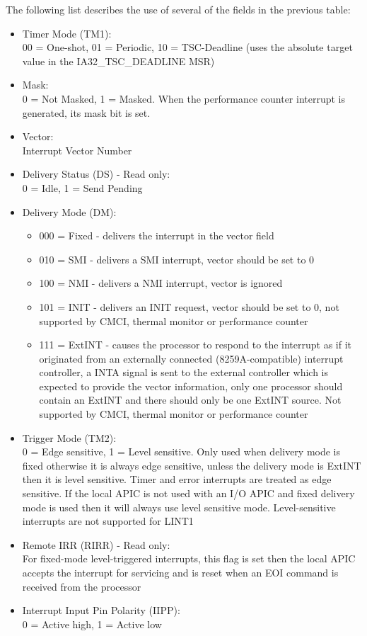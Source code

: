 \documentclass{article}
\newcommand{\layout}[1]{\parbox{\linewidth}{#1}}
\begin{document}
\layout{
  The following list describes the use of several of the fields in the previous table:
  \begin{itemize}
    \item Timer Mode (TM1): \\
      00 = One-shot, 01 = Periodic, 10 = TSC-Deadline (uses the absolute target value in the IA32\_TSC\_DEADLINE MSR)
    \item Mask: \\
      0 = Not Masked, 1 = Masked. When the performance counter interrupt is generated, its mask bit is set.
    \item Vector: \\
      Interrupt Vector Number
    \item Delivery Status (DS) - Read only: \\
      0 = Idle, 1 = Send Pending
    \item Delivery Mode (DM): \begin{itemize}
        \item 000 = Fixed - delivers the interrupt in the vector field
        \item 010 = SMI - delivers a SMI interrupt, vector should be set to 0
        \item 100 = NMI - delivers a NMI interrupt, vector is ignored
        \item 101 = INIT - delivers an INIT request, vector should be set to 0, not supported by CMCI, thermal monitor or performance counter
        \item 111 = ExtINT - causes the processor to respond to the interrupt as if it originated from an externally connected (8259A-compatible) interrupt controller, a INTA signal is sent to the external controller which is expected to provide the vector information, only one processor should contain an ExtINT and there should only be one ExtINT source.
        Not supported by CMCI, thermal monitor or performance counter
      \end{itemize}
    \item Trigger Mode (TM2): \\
      0 = Edge sensitive, 1 = Level sensitive. Only used when delivery mode is fixed otherwise it is always edge sensitive, unless the delivery mode is ExtINT then it is level sensitive. Timer and error interrupts are treated as edge sensitive.  If the local APIC is not used with an I/O APIC and fixed delivery mode is used then it will always use level sensitive mode. Level-sensitive interrupts are not supported for LINT1
    \item Remote IRR (RIRR) - Read only: \\
      For fixed-mode level-triggered interrupts, this flag is set then the local APIC accepts the interrupt for servicing and is reset when an EOI command is received from the processor
    \item Interrupt Input Pin Polarity (IIPP): \\
      0 = Active high, 1 = Active low
  \end{itemize}

  \cite[Chapter~12.5.1]{sdm3}
} \bigskip
\end{document}
